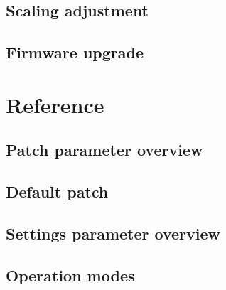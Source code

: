 \documentclass[landscape, 11pt, oneside, twoside]{report}
\newenvironment{flowtext}{\addmargin[0cm]{0cm}}{\endaddmargin} %
\begin{document}
\begin{flowtext}


\section{Scaling adjustment}\label{scalingadj}



\section{Firmware upgrade}\label{fwupgrade}

  

\end{flowtext}

\pagebreak
\chapter{Reference}

\begin{flowtext}

\section{Patch parameter overview}\label{patchref}



\pagebreak
\section{Default patch}\label{defaultpatch}



\pagebreak
\section{Settings parameter overview}\label{settingsref}



\end{flowtext}

\pagebreak

\section{Operation modes}\label{modes}
\end{document}

